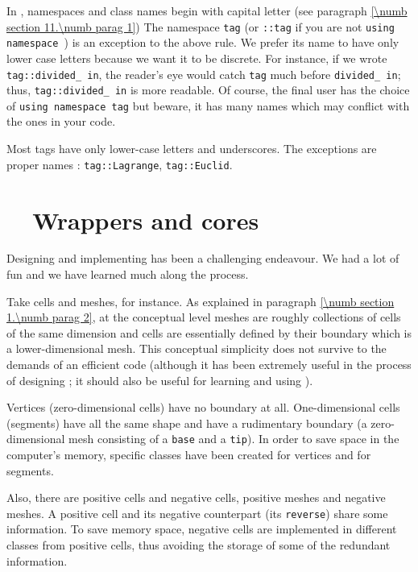 In \maniFEM, namespaces and class names begin with capital letter
(see paragraph \ref{\numb section 11.\numb parag 1})
The namespace {\small\tt\textcolor{tag}{tag}} (or {\small\tt {}::tag} if you are not
{\small\tt using namespace }) is an exception to the above rule.
We prefer its name to have only lower case letters because we want it to be
discrete. For instance, if we wrote {\small\tt\textcolor{tag}{tag}::divided\_\,in},
the reader's eye would catch {\small\tt\textcolor{tag}{tag}} much before {\small\tt divided\_\,in};
thus, {\small\tt\textcolor{tag}{tag}::divided\_\,in} is more readable.
Of course, the final user has the choice of {\small\tt using namespace \textcolor{tag}{tag}}
but beware, it has many names which may conflict with the ones in your code.

Most tags have only lower-case letters and underscores.
The exceptions are proper names : {\small\tt \textcolor{tag}{tag}::Lagrange}, {\small\tt \textcolor{tag}{tag}::Euclid}.


\section{~~Wrappers and cores}\label{\numb section 11.\numb parag 4}

Designing and implementing {\maniFEM} has been a challenging endeavour.
We had a lot of fun and we have learned much along the process.

Take cells and meshes, for instance.
As explained in paragraph \ref{\numb section 1.\numb parag 2}, at the conceptual level meshes
are roughly collections of cells of the same dimension and cells are essentially
defined by their boundary which is a lower-dimensional mesh.
This conceptual simplicity does not survive to the demands of an efficient code
(although it has been extremely useful in the process of designing \maniFEM;
it should also be useful for learning and using \maniFEM).

Vertices (zero-dimensional cells) have no boundary at all.
One-dimensional cells (segments) have all the same shape and have a rudimentary boundary
(a zero-dimensional mesh consisting of a {\small\tt base} and a {\small\tt tip}).
In order to save space in the computer's memory, specific classes have been created for
vertices and for segments.

Also, there are positive cells and negative cells, positive meshes and negative meshes.
A positive cell and its negative counterpart (its {\small\tt reverse}) share some information.
To save memory space, negative cells are implemented in different classes from
positive cells, thus avoiding the storage of some of the redundant information.

